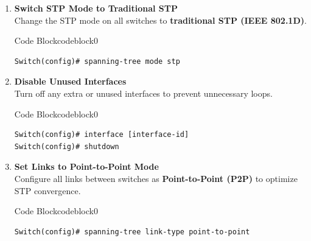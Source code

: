 \documentclass[a4paper]{book}
\begin{document}
\begin{enumerate}
	\item \textbf{Switch STP Mode to Traditional STP} \\
	      Change the STP mode on all switches to \textbf{traditional STP (IEEE 802.1D)}.



	      \begin{ocg}{Code Block}{codeblock}{0}
		      \vspace{0.5cm}
		      \begin{lstlisting}
Switch(config)# spanning-tree mode stp
\end{lstlisting}

	      \end{ocg}

	\item \textbf{Disable Unused Interfaces} \\
	      Turn off any extra or unused interfaces to prevent unnecessary loops.



	      \begin{ocg}{Code Block}{codeblock}{0}
		      \vspace{0.5cm}
		      \begin{lstlisting}
Switch(config)# interface [interface-id]
Switch(config)# shutdown

\end{lstlisting}

	      \end{ocg}


	\item \textbf{Set Links to Point-to-Point Mode} \\
	      Configure all links between switches as \textbf{Point-to-Point (P2P)} to optimize STP convergence.



	      \begin{ocg}{Code Block}{codeblock}{0}
		      \vspace{0.5cm}
		      \begin{lstlisting}
Switch(config)# spanning-tree link-type point-to-point



\end{lstlisting}
\end{ocg}
\end{enumerate}
\end{document}
